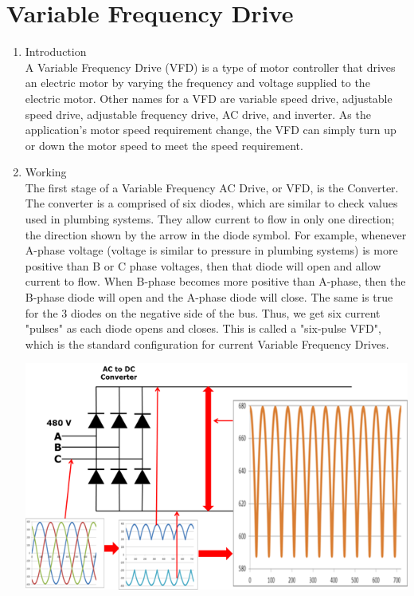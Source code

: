 \documentclass[12pt,a4paper]{scrreprt}
\begin{document}
\section{Variable Frequency Drive}
\begin{enumerate}
  \item Introduction \\
    A Variable Frequency Drive (VFD) is a type of motor controller that drives an electric motor by varying the frequency and voltage supplied to the electric motor. Other names for a VFD are variable speed drive, adjustable speed drive, adjustable frequency drive, AC drive, and inverter. As the application's motor speed requirement change, the VFD can simply turn up or down the motor speed to meet the speed requirement.

  \item Working\\
    The first stage of a Variable Frequency AC Drive, or VFD, is the Converter. The converter is a comprised of six diodes, which are similar to check values used in plumbing systems. They allow current to flow in only one direction; the direction shown by the arrow in the diode symbol. For example, whenever A-phase voltage (voltage is similar to pressure in plumbing systems) is more positive than B or C phase voltages, then that diode will open and allow current to flow. When B-phase becomes more positive than A-phase, then the B-phase diode will open and the A-phase diode will close. The same is true for the 3 diodes on the negative side of the bus. Thus, we get six current "pulses" as each diode opens and closes. This is called a "six-pulse VFD", which is the standard configuration for current Variable Frequency Drives.

    \begin{center}
        \includegraphics{vfd1}
    \end{center}


\end{enumerate}
\end{document}
